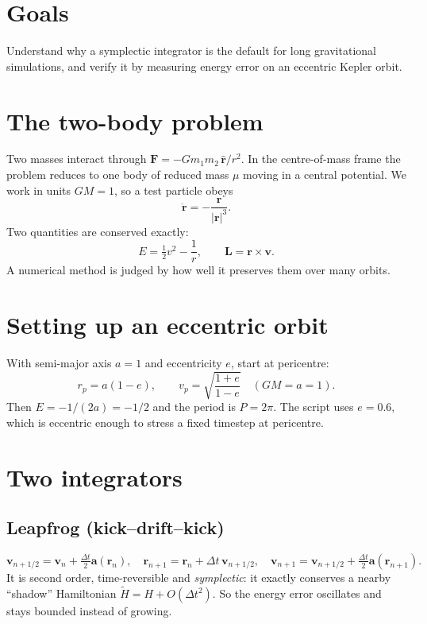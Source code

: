 


\section*{Goals}
Understand why a symplectic integrator is the default for long gravitational simulations, and verify it by measuring energy error on an eccentric Kepler orbit.

\section{The two-body problem}
Two masses interact through $\mathbf F = -Gm_1m_2\,\hat{\mathbf r}/r^2$. In the centre-of-mass frame the problem reduces to one body of reduced mass $\mu$ moving in a central potential. We work in units $GM=1$, so a test particle obeys
\[
\ddot{\mathbf r} = -\frac{\mathbf r}{|\mathbf r|^{3}} .
\]
Two quantities are conserved exactly:
\[
E = \tfrac12 v^2 - \frac1r, \qquad \mathbf L = \mathbf r\times\mathbf v .
\]
A numerical method is judged by how well it preserves them over many orbits.

\section{Setting up an eccentric orbit}
With semi-major axis $a=1$ and eccentricity $e$, start at pericentre:
\[
r_p = a(1-e), \qquad v_p = \sqrt{\frac{1+e}{1-e}} \quad (GM=a=1).
\]
Then $E=-1/(2a)=-1/2$ and the period is $P=2\pi$. The script uses $e=0.6$, which is eccentric enough to stress a fixed timestep at pericentre.

\section{Two integrators}
\subsection*{Leapfrog (kick--drift--kick)}
\[
\mathbf v_{n+1/2} = \mathbf v_n + \tfrac{\Delta t}{2}\mathbf a(\mathbf r_n),\quad
\mathbf r_{n+1} = \mathbf r_n + \Delta t\,\mathbf v_{n+1/2},\quad
\mathbf v_{n+1} = \mathbf v_{n+1/2} + \tfrac{\Delta t}{2}\mathbf a(\mathbf r_{n+1}).
\]
It is second order, time-reversible and \emph{symplectic}: it exactly conserves a nearby ``shadow'' Hamiltonian $\tilde H = H + O(\Delta t^2)$. So the energy error oscillates and stays bounded instead of growing.

